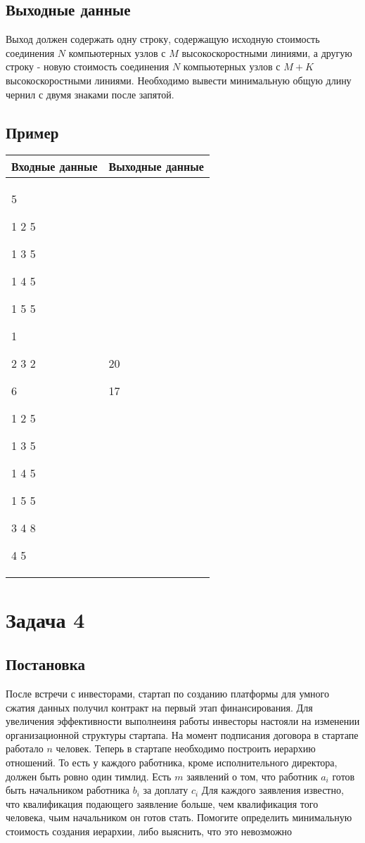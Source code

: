 \documentclass[a4]{article}
\begin{document}
\subsection*{Выходные данные}
\label{sec:orged795e8}
Выход должен содержать одну строку, содержащую исходную стоимость соединения
\(N\) компьютерных узлов с \(M\) высокоскоростными линиями, а другую строку - новую стоимость соединения \(N\) компьютерных узлов с \(M + K\) высокоскоростными линиями. Необходимо вывести минимальную общую длину чернил с двумя знаками после запятой.
\subsection*{Пример}
\label{sec:org6a26c04}

\begin{table}[H]
\begin{center}
\begin{tabular}{|m{4cm}|m{4cm}|}
\hline
Входные данные & Выходные данные \\ \hline
5

1 2 5

1 3 5

1 4 5

1 5 5

1

2 3 2

6

1 2 5

1 3 5

1 4 5

1 5 5

3 4 8

4 5 
&
20

17
\\ \hline
\end{tabular}
\end{center}
\end{table}

\pagebreak
\section*{Задача 4}
\label{sec:orgb1f46a6}
\subsection*{Постановка}
\label{sec:orge854c50}
После встречи с инвесторами, стартап по созданию платформы для умного сжатия данных получил контракт на первый этап финансирования. Для увеличения эффективности выполнеиня работы инвесторы настояли на изменении организационной структуры стартапа. На момент подписания договора в стартапе работало \(n\) человек. Теперь в стартапе необходимо построить иерархию отношений. То есть у каждого работника, кроме исполнительного директора, должен быть ровно один тимлид.
Есть \(m\) заявлений о том, что работник \(a_i\) готов быть начальником работника \(b_i\) за доплату
\(c_i\) Для каждого заявления известно, что квалификация подающего заявление больше, чем
квалификация того человека, чьим начальником он готов стать.
Помогите определить минимальную стоимость создания иерархии, либо выяснить, что
это невозможно
\end{document}
